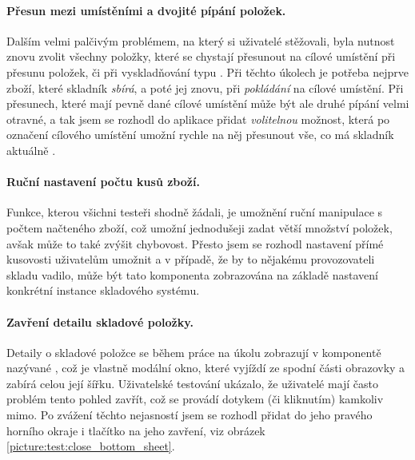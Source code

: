 \paragraph{Přesun mezi umístěními a dvojité pípání položek.} Dalším velmi palčivým problémem, na který si uživatelé stěžovali, byla nutnost znovu zvolit všechny položky, které se chystají přesunout na cílové umístění při přesunu položek, či při vyskladňování typu . Při těchto úkolech je potřeba nejprve  zboží, které skladník \emph{sbírá}, a poté jej  znovu, při \emph{pokládání} na cílové umístění. Při přesunech, které mají pevně dané cílové umístění může být ale druhé pípání velmi otravné, a tak jsem se rozhodl do aplikace přidat \emph{volitelnou} možnost, která po označení cílového umístění umožní rychle na něj přesunout vše, co má skladník aktuálně . 

\paragraph{Ruční nastavení počtu kusů zboží.} Funkce, kterou všichni testeři shodně žádali, je umožnění ruční manipulace s počtem načteného zboží, což umožní jednodušeji zadat větší množství položek, avšak může to také zvýšit chybovost. Přesto jsem se rozhodl nastavení přímé kusovosti uživatelům umožnit a v případě, že by to nějakému provozovateli skladu vadilo, může být tato komponenta zobrazována na základě nastavení konkrétní instance skladového systému.

\paragraph{Zavření detailu skladové položky.} Detaily o skladové položce se během práce na úkolu zobrazují v komponentě nazývané , což je vlastně modální okno, které vyjíždí ze spodní části obrazovky a zabírá celou její šířku. Uživatelské testování ukázalo, že uživatelé mají často problém tento pohled zavřít, což se provádí dotykem (či kliknutím) kamkoliv mimo. Po zvážení těchto nejasností jsem se rozhodl přidat do jeho pravého horního okraje i tlačítko na jeho zavření, viz obrázek \ref{picture:test:close_bottom_sheet}.

